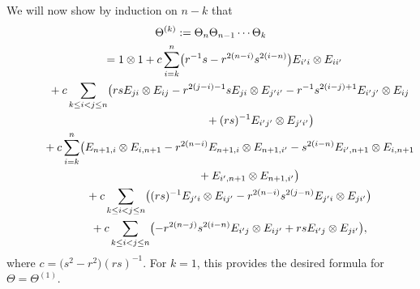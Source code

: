\documentclass[pdftex]{sigma}
\numberwithin{equation}{section}
\begin{document}
We will now show by induction on $n - k$ that{\samepage
\begin{gather}
 \Theta^{(k)} := \Theta_{n}\Theta_{n-1}\cdots \Theta_{k}\nonumber\\
 \hphantom{\Theta^{(k)}{:}}{} =
 1 \otimes 1 + c\sum_{i = k}^{n}\bigl(r^{-1}s - r^{2(n - i)}s^{2(i-n)}\bigr)E_{i'i} \otimes E_{ii'} \nonumber\\
 \hphantom{\Theta^{(k)} :=}{}
 + c \sum_{k \le i < j \le n}\bigl(rsE_{ji} \otimes E_{ij} - r^{2(j - i)-1}sE_{ji} \otimes E_{j'i'} - r^{-1}s^{2(i - j) + 1}E_{i'j'} \otimes E_{ij}\nonumber\\
 \hphantom{\Theta^{(k)} :=+ c \sum_{k \le i < j \le n}\bigl(}{}
 + (rs)^{-1}E_{i'j'} \otimes E_{j'i'}\bigr)\nonumber \\
 \hphantom{\Theta^{(k)} :=}{}
 + c\sum_{i = k}^{n}\bigl(E_{n + 1,i} \otimes E_{i,n+1} - r^{2(n - i)}E_{n + 1,i} \otimes E_{n + 1,i'} - s^{2(i-n)}E_{i',n+1} \otimes E_{i,n+1}\nonumber\\
 \hphantom{\Theta^{(k)} :=+ c\sum_{i = k}^{n}\bigl(}{}
 + E_{i',n+1} \otimes E_{n + 1,i'} \bigr) \nonumber\\
 \hphantom{\Theta^{(k)} :=}{}
 + c \sum_{k \le i < j \le n}\bigl( (rs)^{-1}E_{j'i} \otimes E_{ij'} - r^{2(n-i)}s^{2(j - n)}E_{j'i} \otimes E_{ji'}\bigr) \nonumber\\
 \hphantom{\Theta^{(k)} :=}{}
 +c\sum_{k \le i < j \le n}\bigl( - r^{2(n - j)}s^{2(i - n)}E_{i'j} \otimes E_{ij'} + rsE_{i'j} \otimes E_{ji'} \bigr),\label{eq:Theta_k}
\end{gather}
where $c = \bigl(s^{2} - r^{2}\bigr)(rs)^{-1}$. For $k=1$, this provides the desired formula for $\Theta=\Theta^{(1)}$.}
\end{document}
